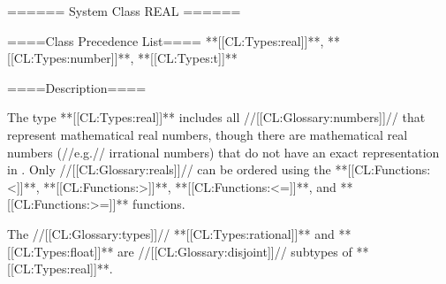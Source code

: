 ====== System Class REAL ======

====Class Precedence List==== **[[CL:Types:real]]**, **[[CL:Types:number]]**, **[[CL:Types:t]]**

====Description====

The type **[[CL:Types:real]]** includes all //[[CL:Glossary:numbers]]// that represent mathematical real numbers, though there are mathematical real numbers (//e.g.// irrational numbers) that do not have an exact representation in \clisp. Only //[[CL:Glossary:reals]]// can be ordered using the **[[CL:Functions:<]]**, **[[CL:Functions:>]]**, **[[CL:Functions:<=]]**, and **[[CL:Functions:>=]]** functions.

The //[[CL:Glossary:types]]// **[[CL:Types:rational]]** and **[[CL:Types:float]]** are //[[CL:Glossary:disjoint]]// subtypes of **[[CL:Types:real]]**.


 
